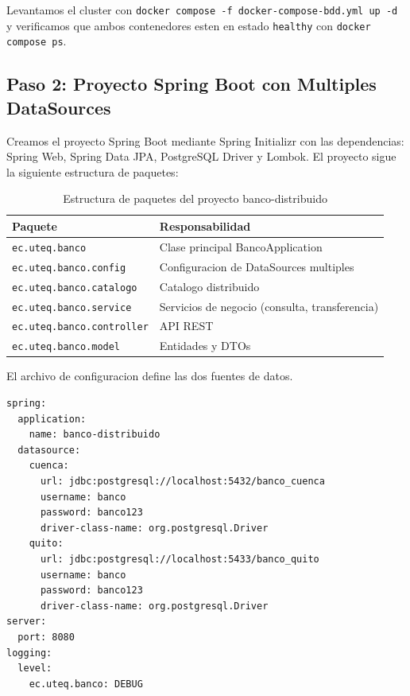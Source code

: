 \documentclass[11pt,a4paper]{article}
\begin{document}
Levantamos el cluster con \texttt{docker compose -f docker-compose-bdd.yml up -d} y verificamos que ambos contenedores esten en estado \texttt{healthy} con \texttt{docker compose ps}.

\subsection{Paso 2: Proyecto Spring Boot con Multiples DataSources}

Creamos el proyecto Spring Boot mediante Spring Initializr con las dependencias: Spring Web, Spring Data JPA, PostgreSQL Driver y Lombok. El proyecto sigue la siguiente estructura de paquetes:

\begin{table}[H]
\centering
\caption{Estructura de paquetes del proyecto banco-distribuido}
\small
\begin{tabular}{ll}
\toprule
\textbf{Paquete} & \textbf{Responsabilidad} \\
\midrule
\texttt{ec.uteq.banco} & Clase principal BancoApplication \\
\texttt{ec.uteq.banco.config} & Configuracion de DataSources multiples \\
\texttt{ec.uteq.banco.catalogo} & Catalogo distribuido \\
\texttt{ec.uteq.banco.service} & Servicios de negocio (consulta, transferencia) \\
\texttt{ec.uteq.banco.controller} & API REST \\
\texttt{ec.uteq.banco.model} & Entidades y DTOs \\
\bottomrule
\end{tabular}
\end{table}

El archivo de configuracion define las dos fuentes de datos.

\begin{lstlisting}[style=YamlStyle,caption={src/main/resources/application.yml: configuracion multi-DataSource}]
spring:
  application:
    name: banco-distribuido
  datasource:
    cuenca:
      url: jdbc:postgresql://localhost:5432/banco_cuenca
      username: banco
      password: banco123
      driver-class-name: org.postgresql.Driver
    quito:
      url: jdbc:postgresql://localhost:5433/banco_quito
      username: banco
      password: banco123
      driver-class-name: org.postgresql.Driver
server:
  port: 8080
logging:
  level:
    ec.uteq.banco: DEBUG
\end{lstlisting}
\end{document}
